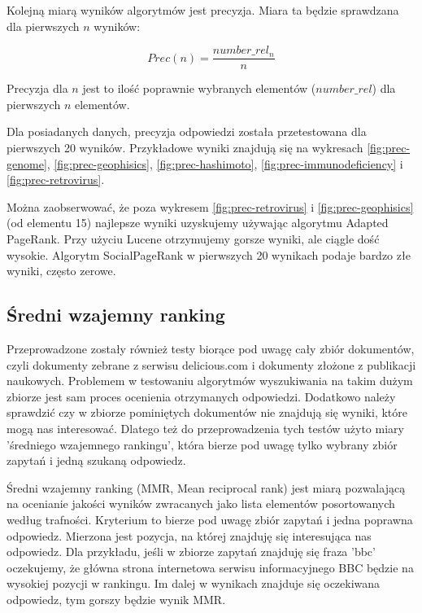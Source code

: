 Kolejną miarą wyników algorytmów jest precyzja. Miara ta będzie sprawdzana dla pierwszych  $n$ wyników:

\begin{equation}
Prec(n) = \frac{number\_rel_n}{n}
\end{equation}

Precyzja dla $n$ jest to ilość poprawnie wybranych elementów ($number\_rel$) dla pierwszych $n$ elementów.


Dla posiadanych danych, precyzja odpowiedzi została przetestowana dla pierwszych 20 wyników. Przykładowe wyniki znajdują się na wykresach \ref{fig:prec-genome},  \ref{fig:prec-geophisics},  \ref{fig:prec-hashimoto},  \ref{fig:prec-immunodeficiency} i  \ref{fig:prec-retrovirus}.



Można zaobserwować, że poza wykresem \ref{fig:prec-retrovirus} i \ref{fig:prec-geophisics} (od elementu 15) najlepsze wyniki uzyskujemy używając algorytmu Adapted PageRank. Przy użyciu Lucene otrzymujemy gorsze wyniki, ale ciągle dość wysokie. Algorytm SocialPageRank w pierwszych 20 wynikach podaje bardzo złe wyniki, często zerowe.



\subsection{Średni wzajemny ranking}


Przeprowadzone zostały również testy biorące pod uwagę cały zbiór
dokumentów, czyli dokumenty zebrane z serwisu delicious.com i dokumenty złożone
z publikacji naukowych. Problemem w testowaniu algorytmów wyszukiwania na
takim dużym zbiorze jest sam proces ocenienia otrzymanych odpowiedzi.  Dodatkowo
należy sprawdzić czy w zbiorze pominiętych dokumentów nie znajdują się
wyniki, które mogą nas interesować. Dlatego też do przeprowadzenia
tych testów użyto miary 'średniego wzajemnego rankingu', która bierze
pod uwagę tylko wybrany zbiór zapytań i jedną szukaną odpowiedz.


Średni wzajemny ranking (MMR, Mean reciprocal rank) jest miarą pozwalającą
na ocenianie jakości wyników zwracanych jako lista elementów
posortowanych według trafności. Kryterium to bierze pod uwagę zbiór
zapytań i jedna poprawna odpowiedz. Mierzona jest pozycja, na której
znajduję się interesująca nas odpowiedz. Dla przykładu, jeśli w
zbiorze zapytań znajduję się fraza 'bbc' oczekujemy, że główna strona
internetowa serwisu informacyjnego BBC będzie na wysokiej pozycji w
rankingu. Im dalej w wynikach znajduje się oczekiwana odpowiedz, tym
gorszy będzie wynik MMR.

